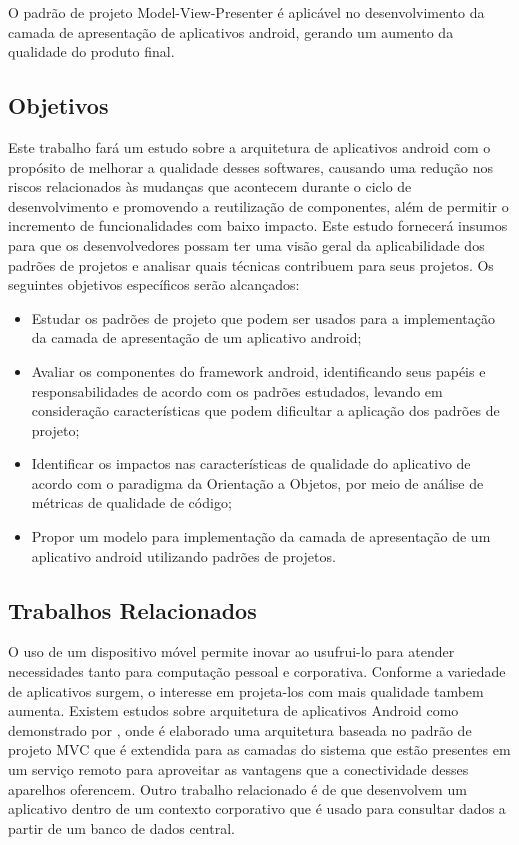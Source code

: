 \documentclass[conference]{IEEEtran}
\begin{document}
O padrão de projeto Model-View-Presenter é aplicável no desenvolvimento da
camada de apresentação de aplicativos android, gerando um aumento da qualidade
do produto final.

\subsection{Objetivos}

Este trabalho fará um estudo sobre a arquitetura de aplicativos android com o
propósito de melhorar a qualidade desses softwares, causando uma redução nos
riscos relacionados às mudanças que acontecem durante o ciclo de desenvolvimento
e promovendo a reutilização de componentes,  além de permitir o incremento de funcionalidades com
baixo impacto. Este estudo fornecerá insumos para que os desenvolvedores possam
ter uma visão geral da aplicabilidade dos padrões de projetos e analisar quais
técnicas contribuem para seus projetos. Os seguintes objetivos específicos serão alcançados:

\begin{itemize}
\item Estudar os padrões de projeto que podem ser usados para a implementação da
camada de apresentação de um aplicativo android;
\item Avaliar os componentes do  framework android, identificando seus papéis e
responsabilidades de acordo com os padrões estudados, levando  em consideração
características que podem dificultar a aplicação dos padrões de projeto;
\item Identificar os impactos nas características de qualidade do aplicativo de acordo
com o paradigma da Orientação a Objetos, por meio de análise de métricas de
qualidade de código;
\item Propor um modelo para implementação da camada de
apresentação de um aplicativo android utilizando padrões de projetos.
\end{itemize}

\subsection{Trabalhos Relacionados}

O uso de um dispositivo móvel permite inovar ao usufrui-lo para atender
necessidades tanto para computação pessoal e corporativa. Conforme a variedade
de aplicativos surgem, o interesse em projeta-los com mais qualidade tambem
aumenta. Existem estudos sobre arquitetura de aplicativos Android como
demonstrado por , onde é elaborado uma arquitetura baseada no
padrão de projeto MVC que é extendida para as camadas do sistema que estão
presentes em um serviço remoto para aproveitar as vantagens que a conectividade
desses aparelhos oferencem. Outro trabalho relacionado é
de  que desenvolvem um aplicativo dentro de um
contexto corporativo que é usado para consultar dados a partir de um banco de
dados central.
\end{document}

